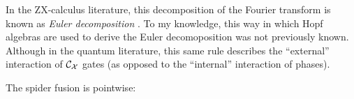 \begin{theorem}
In the ZX-calculus literature, this decomposition of the Fourier transform is known as {\it Euler decomposition} \cite{duncan2009graph}.  To my knowledge, this way in which Hopf algebras are used to derive the Euler decomoposition was not previously known.  Although in the quantum literature, this same rule describes the ``external'' interaction of ${\cal C}_{\cal X}$ gates (as opposed to the ``internal'' interaction of phases).




%
%
%
%
\end{theorem}






The spider fusion is pointwise:

